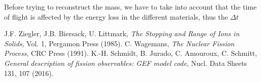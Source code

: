 \documentclass{article}
\begin{document}
Before trying to reconstruct the mass, we have to take into account that the time of flight is affected by the energy loss in the different materials, thus the $\Delta t$ 
\begin{thebibliography}{9}
    J.F. Ziegler, J.B. Biersack, U. Littmark,
    \textit{The Stopping and Range of Ions in Solids},
     Vol. 1, Pergamon Press (1985).
    C. Wagemans,
    \textit{The Nuclear Fission Process},
     CRC Press (1991).
    K.-H. Schmidt, B. Jurado, C. Amouroux, C. Schmitt,
    \textit{General description of fission observables: GEF model code},
     Nucl. Data Sheets 131, 107 (2016). 


\end{thebibliography}
\end{document}
